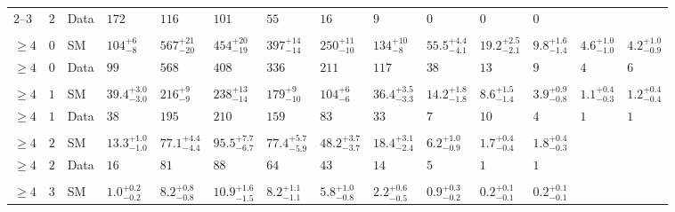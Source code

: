 \begin{landscape}
\begin{center}
\begin{table}[h!]
\begin{tabular}{ llllllllllllll }
    2--3                 & $2$      & Data & $172$                 & $116$                & $101$                & $55$                 & $16$                 & $9$                  & $0$                  & $0$                  & $0$                  & \multicolumn{2}{c}{}                      \\ \\
    $\geq 4$             & $0$      & SM   & $104^{+6}_{-8}$       & $567^{+21}_{-20}$    & $454^{+20}_{-19}$    & $397^{+14}_{-14}$    & $250^{+11}_{-10}$    & $134^{+10}_{-8}$     & $55.5^{+4.4}_{-4.1}$ & $19.2^{+2.5}_{-2.1}$ & $9.8^{+1.6}_{-1.4}$  & $4.6^{+1.0}_{-1.0}$ & $4.2^{+1.0}_{-0.9}$ \\ 
    $\geq 4$             & $0$      & Data & $99$                  & $568$                & $408$                & $336$                & $211$                & $117$                & $38$                 & $13$                 & $9$                  & $4$                 & $6$                 \\\\
    $\geq 4$             & $1$      & SM   & $39.4^{+3.0}_{-3.0}$  & $216^{+9}_{-9}$      & $238^{+13}_{-14}$    & $179^{+9}_{-10}$     & $104^{+6}_{-6}$      & $36.4^{+3.5}_{-3.3}$ & $14.2^{+1.8}_{-1.8}$ & $8.6^{+1.5}_{-1.4}$  & $3.9^{+0.9}_{-0.8}$  & $1.1^{+0.4}_{-0.3}$ & $1.2^{+0.4}_{-0.4}$ \\ 
    $\geq 4$             & $1$      & Data & $38$                  & $195$                & $210$                & $159$                & $83$                 & $33$                 & $7$                  & $10$                 & $4$                  & $1$                 & $1$                 \\\\
    $\geq 4$             & $2$      & SM   & $13.3^{+1.0}_{-1.0}$  & $77.1^{+4.4}_{-4.4}$ & $95.5^{+7.7}_{-6.7}$ & $77.4^{+5.7}_{-5.9}$ & $48.2^{+3.7}_{-3.7}$ & $18.4^{+3.1}_{-2.4}$ & $6.2^{+1.0}_{-0.9}$  & $1.7^{+0.4}_{-0.4}$  & $1.8^{+0.4}_{-0.3}$  & \multicolumn{2}{c}{}                      \\ 
    $\geq 4$             & $2$      & Data & $16$                  & $81$                 & $88$                 & $64$                 & $43$                 & $14$                 & $5$                  & $1$                  & $1$                  & \multicolumn{2}{c}{}                      \\\\ 
    $\geq 4$             & $3$      & SM   & $1.0^{+0.2}_{-0.2}$   & $8.2^{+0.8}_{-0.8}$  & $10.9^{+1.6}_{-1.5}$ & $8.2^{+1.1}_{-1.1}$  & $5.8^{+1.0}_{-0.8}$  & $2.2^{+0.6}_{-0.5}$  & $0.9^{+0.3}_{-0.2}$  & $0.2^{+0.1}_{-0.1}$  & $0.2^{+0.1}_{-0.1}$  & \multicolumn{2}{c}{}                      \\ 

\end{tabular}
\end{table}
\end{center}
\end{landscape}
